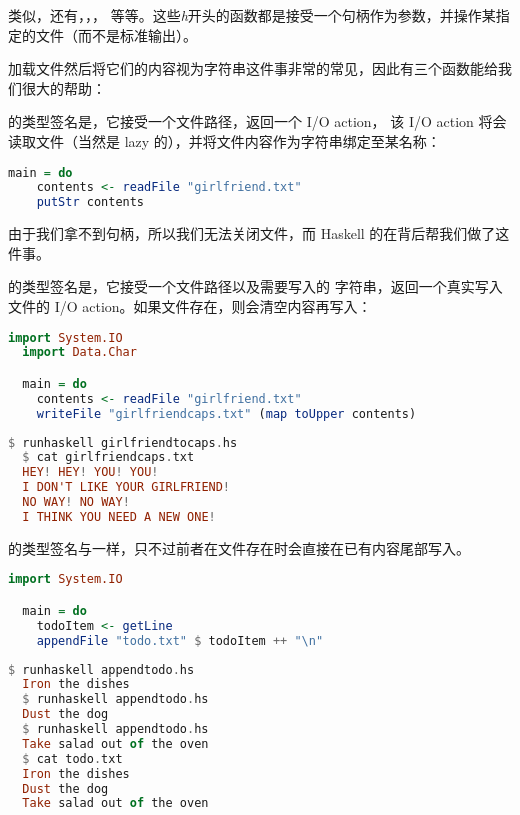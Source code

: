 \documentclass[./main.tex]{subfiles}
\begin{document}
类似，还有，，，
等等。这些\textit{h}开头的函数都是接受一个句柄作为参数，并操作某指定的文件（而不是标准输出）。

加载文件然后将它们的内容视为字符串这件事非常的常见，因此有三个函数能给我们很大的帮助：

的类型签名是，它接受一个文件路径，返回一个 I/O action，
该 I/O action 将会读取文件（当然是 lazy 的），并将文件内容作为字符串绑定至某名称：

\begin{lstlisting}[language=Haskell]
  main = do
    contents <- readFile "girlfriend.txt"
    putStr contents
\end{lstlisting}

由于我们拿不到句柄，所以我们无法关闭文件，而 Haskell 的在背后帮我们做了这件事。

的类型签名是，它接受一个文件路径以及需要写入的
字符串，返回一个真实写入文件的 I/O action。如果文件存在，则会清空内容再写入：

\begin{lstlisting}[language=Haskell]
  import System.IO
  import Data.Char

  main = do
    contents <- readFile "girlfriend.txt"
    writeFile "girlfriendcaps.txt" (map toUpper contents)
\end{lstlisting}

\begin{lstlisting}[language=Haskell]
  $ runhaskell girlfriendtocaps.hs
  $ cat girlfriendcaps.txt
  HEY! HEY! YOU! YOU!
  I DON'T LIKE YOUR GIRLFRIEND!
  NO WAY! NO WAY!
  I THINK YOU NEED A NEW ONE!
\end{lstlisting}

的类型签名与一样，只不过前者在文件存在时会直接在已有内容尾部写入。

\begin{lstlisting}[language=Haskell]
  import System.IO

  main = do
    todoItem <- getLine
    appendFile "todo.txt" $ todoItem ++ "\n"
\end{lstlisting}

\begin{lstlisting}[language=Haskell]
  $ runhaskell appendtodo.hs
  Iron the dishes
  $ runhaskell appendtodo.hs
  Dust the dog
  $ runhaskell appendtodo.hs
  Take salad out of the oven
  $ cat todo.txt
  Iron the dishes
  Dust the dog
  Take salad out of the oven
\end{lstlisting}
\end{document}
